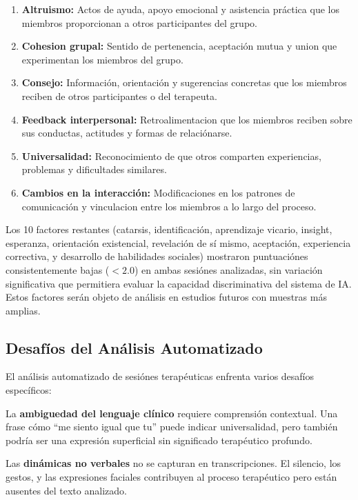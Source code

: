 \documentclass[12pt,a4paper,twoside]{book}
\begin{document}
\begin{enumerate}
    \item \textbf{Altruismo:} Actos de ayuda, apoyo emocional y asistencia práctica que los miembros proporcionan a otros participantes del grupo.
    \item \textbf{Cohesion grupal:} Sentido de pertenencia, aceptación mutua y union que experimentan los miembros del grupo.
    \item \textbf{Consejo:} Información, orientación y sugerencias concretas que los miembros reciben de otros participantes o del terapeuta.
    \item \textbf{Feedback interpersonal:} Retroalimentacion que los miembros reciben sobre sus conductas, actitudes y formas de relaciónarse.
    \item \textbf{Universalidad:} Reconocimiento de que otros comparten experiencias, problemas y dificultades similares.
    \item \textbf{Cambios en la interacción:} Modificaciones en los patrones de comunicación y vinculacion entre los miembros a lo largo del proceso.
\end{enumerate}

Los 10 factores restantes (catarsis, identificación, aprendizaje vicario, insight, esperanza, orientación existencial, revelación de sí mismo, aceptación, experiencia correctiva, y desarrollo de habilidades sociales) mostraron puntuaciónes consistentemente bajas ($< 2.0$) en ambas sesiónes analizadas, sin variación significativa que permitiera evaluar la capacidad discriminativa del sistema de IA. Estos factores serán objeto de análisis en estudios futuros con muestras más amplias.

\subsection{Desafíos del Análisis Automatizado}

El análisis automatizado de sesiónes terapéuticas enfrenta varios desafíos específicos:

La \textbf{ambiguedad del lenguaje clínico} requiere comprensión contextual. Una frase cómo ``me siento igual que tu'' puede indicar universalidad, pero también podría ser una expresión superficial sin significado terapéutico profundo.

Las \textbf{dinámicas no verbales} no se capturan en transcripciones. El silencio, los gestos, y las expresiones faciales contribuyen al proceso terapéutico pero están ausentes del texto analizado.
\end{document}
